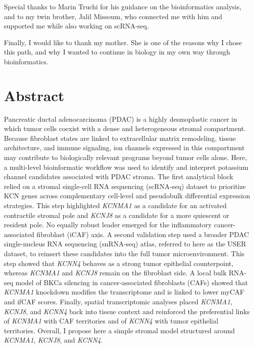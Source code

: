 \documentclass[11pt,a4paper]{article}
\begin{document}
Special thanks to Marin Truchi for his guidance on the bioinformatics analysis, and to my twin brother, Jalil Missoum, who connected me with him and supported me while also working on scRNA-seq.

Finally, I would like to thank my mother. She is one of the reasons why I chose this path, and why I wanted to continue in biology in my own way through bioinformatics. 

\clearpage
{}
\section*{Abstract}
Pancreatic ductal adenocarcinoma (PDAC) is a highly desmoplastic cancer in which tumor cells coexist with a dense and heterogeneous stromal compartment. Because fibroblast states are linked to extracellular matrix remodeling, tissue architecture, and immune signaling, ion channels expressed in this compartment may contribute to biologically relevant programs beyond tumor cells alone. Here, a multi-level bioinformatic workflow was used to identify and interpret potassium channel candidates associated with PDAC stroma. The first analytical block relied on a stromal single-cell RNA sequencing (scRNA-seq) dataset to prioritize KCN genes across complementary cell-level and pseudobulk differential expression strategies. This step highlighted \textit{KCNMA1} as a candidate for an activated contractile stromal pole and \textit{KCNJ8} as a candidate for a more quiescent or resident pole. No equally robust leader emerged for the inflammatory cancer-associated fibroblast (iCAF) axis. A second validation step used a broader PDAC single-nucleus RNA sequencing (snRNA-seq) atlas, referred to here as the USER dataset, to reinsert these candidates into the full tumor microenvironment. This step showed that \textit{KCNN4} behaves as a strong tumor epithelial counterpoint, whereas \textit{KCNMA1} and \textit{KCNJ8} remain on the fibroblast side. A local bulk RNA-seq model of BKCa silencing in cancer-associated fibroblasts (CAFs) showed that \textit{KCNMA1} knockdown modifies the transcriptome and is linked to lower myCAF and ifCAF scores. Finally, spatial transcriptomic analyses placed \textit{KCNMA1}, \textit{KCNJ8}, and \textit{KCNN4} back into tissue context and reinforced the preferential links of \textit{KCNMA1} with CAF territories and of \textit{KCNN4} with tumor epithelial territories. Overall, I propose here a simple stromal model structured around \textit{KCNMA1}, \textit{KCNJ8}, and \textit{KCNN4}.
\end{document}
